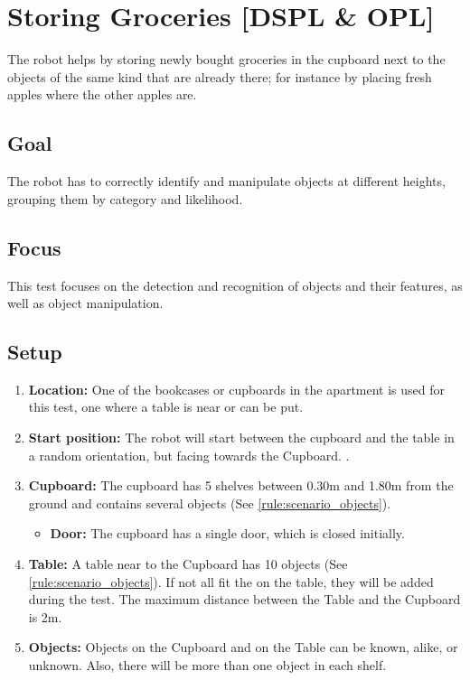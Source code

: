 \section{Storing Groceries [DSPL \& OPL]}
The robot helps by storing newly bought groceries in the cupboard next to the objects of the same kind that are already there; for instance by placing fresh apples where the other apples are.

\subsection{Goal}
The robot has to correctly identify and manipulate objects at different heights, grouping them by category and likelihood.

\subsection{Focus}
This test focuses on the detection and recognition of objects and their features, as well as object manipulation.

\subsection{Setup}
\begin{enumerate}
	\item \textbf{Location:} One of the bookcases or cupboards in the apartment is used for this test, one where a table is near or can be put. 
	\item \textbf{Start position:} The robot will start between the cupboard and the table in a random orientation, but facing towards the Cupboard.
	. 
	\item \textbf{Cupboard:} The cupboard has 5 shelves between 0.30m and 1.80m from the ground and contains several objects (See \ref{rule:scenario_objects}).
	\begin{itemize}
	 	\item \textbf{Door:} The cupboard has a single door, which is closed initially.
	\end{itemize} 
	\item \textbf{Table:} A table near to the Cupboard has 10 objects (See \ref{rule:scenario_objects}). If not all fit the on the table, they will be added during the test. The maximum distance between the Table and the Cupboard is 2m.
	\item \textbf{Objects:} Objects on the Cupboard and on the Table can be known, alike, or unknown. Also, there will be more than one object in each shelf. 
\end{enumerate}


